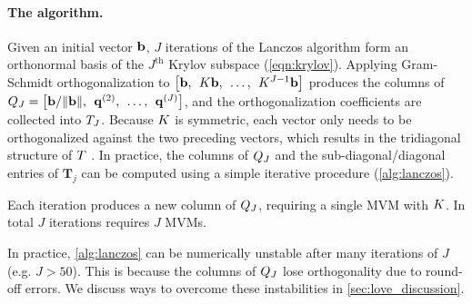 \paragraph{The algorithm.}
Given an initial vector $\mathbf{b}$, $J$ iterations of the Lanczos algorithm form an orthonormal basis of the $J^\text{th}$ Krylov subspace (\cref{eqn:krylov}).
Applying Gram-Schmidt orthogonalization to $\left[ \mathbf{b}, \:\: K \mathbf{b}, \:\: \ldots, \:\: K^{J-1} \mathbf{b} \right]$ produces the columns of $Q_J = \left[ \mathbf{b}/\Vert \mathbf{b} \Vert, \:\: \mathbf{q}^{(2)}, \:\: \ldots, \:\: \mathbf{q}^{(J)} \right]$, and the orthogonalization coefficients are collected into $T_J$.
Because $K$ is symmetric, each vector only needs to be orthogonalized against the two preceding vectors, which results in the tridiagonal structure of $T$ \cite{golub2012matrix}.
In practice, the columns of $Q_J$ and the sub-diagonal/diagonal entries of $\mathbf T_j$ can be computed using a simple iterative procedure (\cref{alg:lanczos}).
%

%
Each iteration produces a new column of $Q_J$, requiring a single MVM with $K$.
In total $J$ iterations requires $J$ MVMs.

In practice, \cref{alg:lanczos} can be numerically unstable after many iterations of $J$ (e.g. $J > 50$).
This is because the columns of $Q_J$ lose orthogonality due to round-off errors.
We discuss ways to overcome these instabilities in \cref{sec:love_discussion}.



